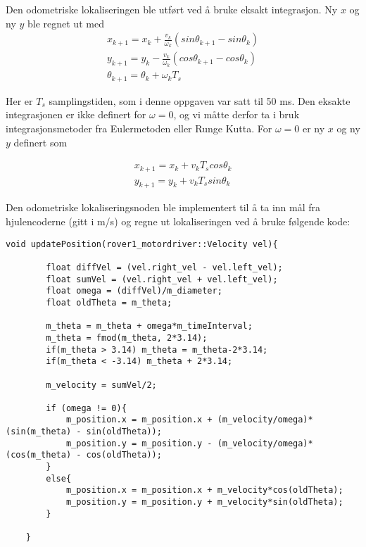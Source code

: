 
Den odometriske lokaliseringen ble utført ved å bruke eksakt integrasjon. Ny \(x\) og ny \(y\) ble regnet ut med
\begin{equation}
\begin{array}{ll}
x_{k+1} = x_k + \frac{v_k}{\omega_k}(sin\theta_{k+1} - sin\theta_k) \\
y_{k+1} = y_k - \frac{v_k}{\omega_k}(cos\theta_{k+1} - cos\theta_k) \\
\theta_{k+1} = \theta_k + \omega_kT_s
\end{array}
\end{equation}

Her er \(T_s\) samplingstiden, som i denne oppgaven var satt til 50 ms. Den eksakte integrasjonen er ikke definert for \(\omega = 0\), og vi måtte derfor ta i bruk integrasjonsmetoder fra Eulermetoden eller Runge Kutta. For \(\omega = 0\) er ny \(x\) og ny \(y\) definert som

\begin{equation}
\begin{array}{ll}
x_{k+1} = x_k + v_kT_scos\theta_k \\
y_{k+1} = y_k + v_kT_ssin\theta_k
\end{array}
\end{equation}

Den odometriske lokaliseringsnoden ble implementert til å ta inn mål fra hjulencoderne (gitt i m/s) og regne ut lokaliseringen ved å bruke følgende kode:

\begin{lstlisting}[frame=single]
void updatePosition(rover1_motordriver::Velocity vel){

        float diffVel = (vel.right_vel - vel.left_vel);
        float sumVel = (vel.right_vel + vel.left_vel);
        float omega = (diffVel)/m_diameter;
        float oldTheta = m_theta;

        m_theta = m_theta + omega*m_timeInterval;
        m_theta = fmod(m_theta, 2*3.14);
        if(m_theta > 3.14) m_theta = m_theta-2*3.14;
        if(m_theta < -3.14) m_theta + 2*3.14;

        m_velocity = sumVel/2;

        if (omega != 0){
            m_position.x = m_position.x + (m_velocity/omega)*(sin(m_theta) - sin(oldTheta));
            m_position.y = m_position.y - (m_velocity/omega)*(cos(m_theta) - cos(oldTheta));
        }
        else{
            m_position.x = m_position.x + m_velocity*cos(oldTheta);
            m_position.y = m_position.y + m_velocity*sin(oldTheta);
        }

    }

\end{lstlisting}
